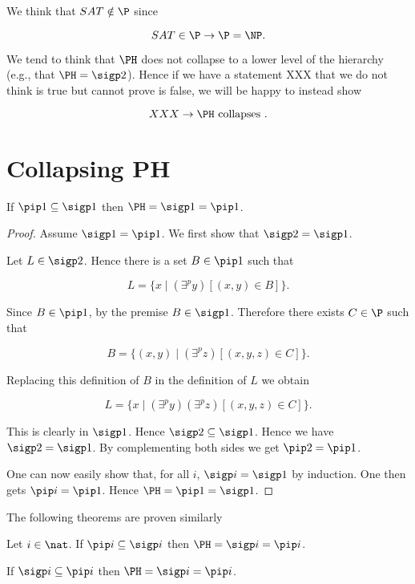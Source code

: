 \documentclass[12pt]{article}
\begin{document}
We think that $SAT\notin \P$ since

$$SAT \in \P \rightarrow  \P=\NP.$$

We tend to think that $\PH$ does not collapse to a lower level
of the hierarchy (e.g., that $\PH=\sigp 2$).
Hence if we have a statement XXX that we do not think is true
but cannot prove is false, we will be happy to instead show

$$XXX \rightarrow \PH \hbox{ collapses }.$$

\section{Collapsing PH}

\begin{theorem}
If $\pip 1 \subseteq \sigp 1$ then $\PH  = \sigp 1 = \pip 1$.
\end{theorem}

\begin{proof}
Assume $\sigp 1 = \pip 1$.
We first show that $\sigp 2 = \sigp 1$.

Let $L\in \sigp 2$. Hence there is a set $B\in \pip 1$ such that

$$L = \{ x \mid (\exists^p y)[(x,y)\in B]\}.$$

Since $B\in \pip 1$, by the premise $B\in \sigp 1$.
Therefore there exists $C\in \P$ such that

$$B = \{ (x,y) \mid (\exists^p z)[(x,y,z)\in C]\}.$$

Replacing this definition of $B$ in the definition of $L$
we obtain

$$L = \{ x \mid (\exists^p y)(\exists^p z)[(x,y,z)\in C]\}.$$

This is clearly in $\sigp 1$. Hence $\sigp 2 \subseteq \sigp 1$.
Hence we have $\sigp 2 = \sigp 1$.
By complementing both sides we get $\pip 2 = \pip 1$.


One can now easily show that, for all $i$, $\sigp i = \sigp 1$
by induction. One then gets $\pip i = \pip 1$.
Hence $\PH = \pip 1 = \sigp 1$.
\end{proof}

The following theorems are proven similarly

\begin{theorem}
Let $i\in\nat$.
If $\pip i \subseteq \sigp i$ then $\PH  = \sigp i = \pip i$.
\end{theorem}


\begin{theorem}
If $\sigp i \subseteq \pip i$ then $\PH  = \sigp i = \pip i$.
\end{theorem}
\end{document}
